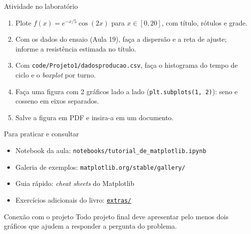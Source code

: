 \documentclass[aspectratio=169,10pt,t]{beamer}
\begin{document}
\begin{frame}{Atividade no laboratório}
  \begin{enumerate}
    \item Plote \(f(x)=e^{-x/5}\cos(2x)\) para \(x\in[0,20]\), com título, rótulos e grade.
    \item Com os dados do ensaio (Aula 19), faça a dispersão e a reta de ajuste; informe a resistência estimada no título.
    \item Com \texttt{code/Projeto1/dadosproducao.csv}, faça o histograma do tempo de ciclo e o \emph{boxplot} por turno.
    \item Faça uma figura com 2 gráficos lado a lado (\texttt{plt.subplots(1, 2)}): seno e cosseno em eixos separados.
    \item Salve a figura em PDF e insira-a em um documento.
  \end{enumerate}
\end{frame}

\begin{frame}{Para praticar e consultar}
  \begin{itemize}
    \item Notebook da aula: \texttt{notebooks/tutorial\_de\_matplotlib.ipynb}
    \item Galeria de exemplos: \texttt{matplotlib.org/stable/gallery/}
    \item Guia rápido: \emph{cheat sheets} do Matplotlib
    \item Exercícios adicionais do livro: \href{\siteurl extras/}{\texttt{\siteurl extras/}}
  \end{itemize}
  \begin{exampleblock}{Conexão com o projeto}
    Todo projeto final deve apresentar \alert{pelo menos dois gráficos} que ajudem a responder a pergunta do problema.
  \end{exampleblock}
\end{frame}

\end{document}
